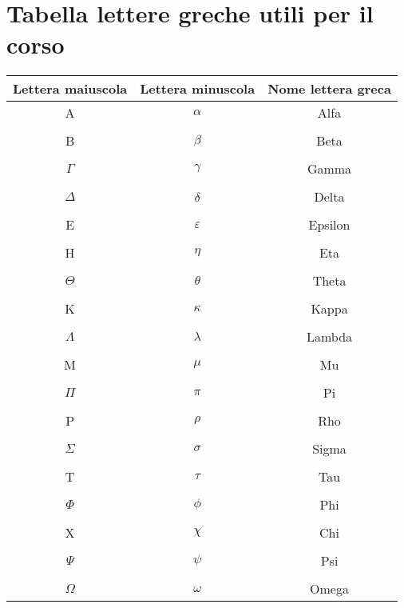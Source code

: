 \section*{Tabella lettere greche utili per il corso}

\begin{center}
\begin{tabular}{ c c c }
    
Lettera maiuscola & Lettera minuscola & Nome lettera greca \\
\hline 
A & $\alpha$ & Alfa \\ \\
B & $\beta$ & Beta \\ \\
$\Gamma$ & $\gamma$ & Gamma \\ \\
$\Delta$ & $\delta$ & Delta \\ \\  
E & $\varepsilon$ & Epsilon \\ \\
H & $\eta$ & Eta  \\ \\ 
$\Theta$ & $\theta$ & Theta \\ \\  
K & $\kappa$ & Kappa \\ \\ 
$\Lambda$ & $\lambda$ & Lambda \\ \\ 
M & $\mu$ & Mu \\ \\ 
$\Pi$ & $\pi$ & Pi \\ \\ 
P & $\rho$ & Rho \\ \\
$\Sigma$ & $\sigma$ & Sigma \\ \\  
T & $\tau$ & Tau \\ \\ 
$\Phi$ & $\phi$ & Phi \\ \\
X & $\chi$ & Chi \\ \\ 
$\Psi$ & $\psi$ & Psi \\ \\ 
$\Omega$ & $\omega$ & Omega  




\end{tabular}
\end{center}

\newpage 